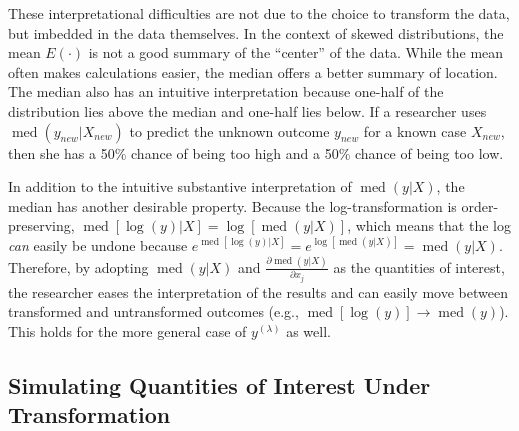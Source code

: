 \documentclass[12pt]{article}
\DeclareMathOperator{\med}{med}
\begin{document}
These interpretational difficulties are not due to the choice to transform the data, but imbedded in the data themselves. 
In the context of skewed distributions, the mean $E(\cdot)$ is not a good summary of the ``center'' of the data. 
While the mean often makes calculations easier, the median offers a better summary of location. 
The median also has an intuitive interpretation because one-half of the distribution lies above the median and one-half lies below. 
If a researcher uses $\med(y_{new} | X_{new})$ to predict the unknown outcome $y_{new}$ for a known case $X_{new}$, then she has a 50\% chance of being too high and a 50\% chance of being too low. 

In addition to the intuitive substantive interpretation of $\med(y | X)$, the median has another desirable property. 
Because the log-transformation is order-preserving, $\med[\log(y) | X] = \log [\med(y | X)]$, which means that the log \textit{can} easily be undone because $e^{\med[\log(y) | X]} = e^{\log[\med(y | X)]} = \med(y | X)$. 
Therefore, by adopting $\med(y | X)$ and $\frac{\partial \med(y | X)}{\partial x_j}$ as the quantities of interest, the researcher eases the interpretation of the results and can easily move between transformed and untransformed outcomes (e.g., $\med[\log(y)] \rightarrow \med(y)$). 
This holds for the more general case of $y^{(\lambda)}$ as well.

\subsection*{Simulating Quantities of Interest Under Transformation}
\end{document}
